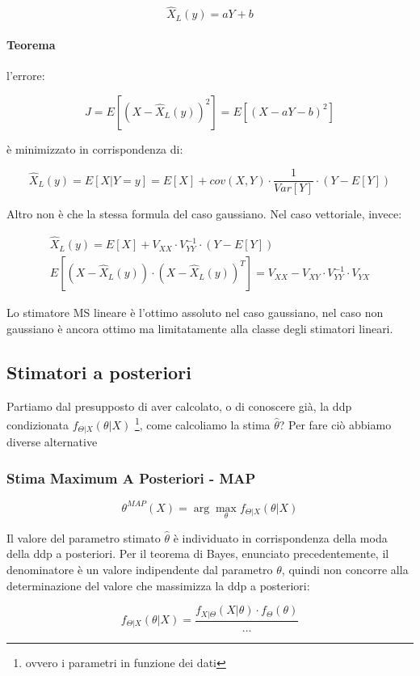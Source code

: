   \[ \hat{X}_L(y)=aY+b \]
  
\paragraph{Teorema} l'errore:

  \[ J=E\left[(X-\hat{X}_L(y))^2\right]=E\left[(X-aY-b)^2\right] \]
  
è minimizzato in corrispondenza di:

  \[ \hat{X}_L(y)=E[X|Y=y]=E[X]+cov(X,Y) \cdot \frac{1}{Var[Y]} \cdot (Y-E[Y])\]
  
Altro non è che la stessa formula del caso gaussiano. Nel caso vettoriale, invece:

  \begin{gather*}
    \hat{X}_L(y)=E[X]+V_{XX} \cdot V_{YY}^{-1} \cdot (Y-E[Y]) \\
    E\left[(X-\hat{X}_L(y))\cdot (X-\hat{X}_L(y))^T\right]=V_{XX}-V_{XY} \cdot V_{YY}^{-1}  \cdot V_{YX}
  \end{gather*}
  
Lo stimatore MS lineare è l'ottimo assoluto nel caso gaussiano, nel caso non gaussiano è ancora ottimo ma limitatamente alla classe degli stimatori lineari.
\subsection{Stimatori a posteriori}
Partiamo dal presupposto di aver calcolato, o di conoscere già, la ddp condizionata $f_{\Theta|X}(\theta|X)$ \footnote{ovvero i parametri in funzione dei dati}, come calcoliamo la stima $\hat{\theta}$? Per fare ciò abbiamo diverse alternative
\subsubsection{Stima Maximum A Posteriori - MAP}  %
  \[ \theta^{MAP}(X)=\arg \max_\theta f_{\Theta|X}(\theta|X) \]
  
Il valore del parametro stimato $\hat{\theta}$ è individuato in corrispondenza della moda della ddp a posteriori.
Per il teorema di Bayes, enunciato precedentemente, il denominatore è un valore indipendente dal parametro $\theta$, quindi non concorre alla determinazione del valore che massimizza la ddp a posteriori:

  \[ f_{\Theta|X}(\theta|X)=\frac{f_{X|\Theta}(X|\theta) \cdot f_\Theta(\theta)}{...} \]
  
